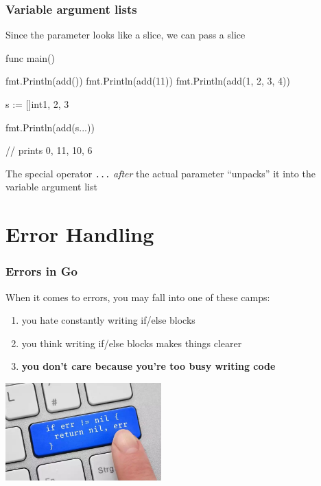 \documentclass[handout,compress,t,11pt]{beamer}
\begin{document}
\begin{frame}[fragile]
    \frametitle{Variable argument lists}
    Since the parameter looks like a slice, we can pass a slice
\begin{golang}
func main() {
	fmt.Println(add())
	fmt.Println(add(11))
	fmt.Println(add(1, 2, 3, 4))

    s := []int{1, 2, 3}

    fmt.Println(add(s...))
}

// prints 0, 11, 10, 6
\end{golang}
\vspace{\baselineskip}
The special operator \verb|...| {\em after} the actual parameter
``unpacks'' it into the variable argument list
\end{frame}


\section{Error Handling}
\begin{frame}[fragile]
    \frametitle{Errors in Go}
When it comes to errors, you may fall into one of these camps:
\begin{enumerate}
\item you hate constantly writing if/else blocks
\vspace{0.4\baselineskip}
\item you think writing if/else blocks makes things clearer
\vspace{0.4\baselineskip}
\item {\bf you don't care because you're too busy writing code}
\end{enumerate}
\vspace{\baselineskip}
\begin{center}
 \includegraphics[width=0.45\textwidth]{go-error-key.jpg}
\end{center}
\end{frame}
\end{document}
